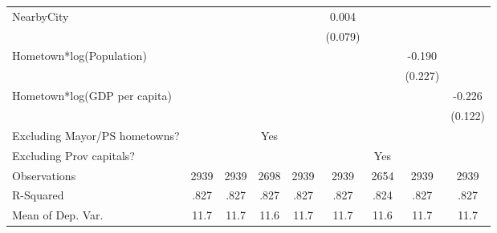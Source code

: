 \begin{table}[p]
\begin{threeparttable}
{\begin{tabular}{l*{8}{c}}
NearbyCity          &                     &                     &                     &                     &       0.004         &                     &                     &                     \\
                    &                     &                     &                     &                     &     (0.079)         &                     &                     &                     \\
Hometown*log(Population)&                     &                     &                     &                     &                     &                     &      -0.190         &                     \\
                    &                     &                     &                     &                     &                     &                     &     (0.227)         &                     \\
Hometown*log(GDP per capita)&                     &                     &                     &                     &                     &                     &                     &      -0.226\sym{*}  \\
                    &                     &                     &                     &                     &                     &                     &                     &     (0.122)         \\
\hline
Excluding Mayor/PS hometowns? &     &     & Yes &     &     &     &     &  \\
Excluding Prov capitals?          &     &     &     &     &     & Yes &     &  \\
\hline
Observations        &        2939         &        2939         &        2698         &        2939         &        2939         &        2654         &        2939         &        2939         \\
R-Squared           &        .827         &        .827         &        .827         &        .827         &        .827         &        .824         &        .827         &        .827         \\
Mean of Dep. Var.   &        11.7         &        11.7         &        11.6         &        11.7         &        11.7         &        11.6         &        11.7         &        11.7         \\
\hline\hline
\end{tabular}}
\captionsetup{justification=justified,labelformat=empty}
\begin{tablenotes}

\end{tablenotes}
\end{threeparttable}
\end{table}

